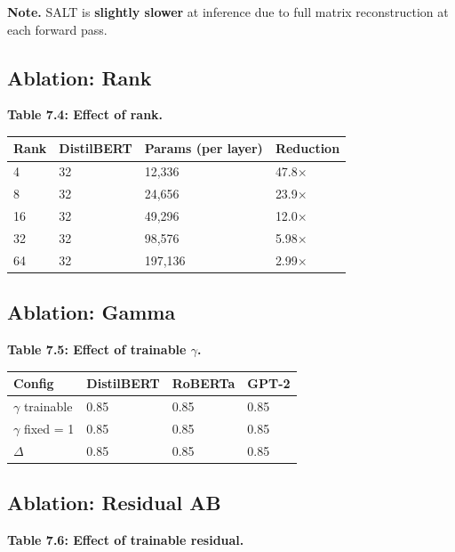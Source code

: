 \textbf{Note.} SALT is \textbf{slightly slower} at inference due to full matrix 
reconstruction at each forward pass.

\subsection{Ablation: Rank}

\textbf{Table 7.4: Effect of rank.}

\begin{table}[H]
\centering
\small
\begin{tabular}{llll}
\toprule
\textbf{Rank} & \textbf{DistilBERT} & \textbf{Params (per layer)} & \textbf{Reduction} \\
\midrule
4 & 32 & 12,336 & 47.8$\times$ \\
8 & 32 & 24,656 & 23.9$\times$ \\
16 & 32 & 49,296 & 12.0$\times$ \\
32 & 32 & 98,576 & 5.98$\times$ \\
64 & 32 & 197,136 & 2.99$\times$ \\
\bottomrule
\end{tabular}
\end{table}

\subsection{Ablation: Gamma}

\textbf{Table 7.5: Effect of trainable $\gamma$.}

\begin{table}[H]
\centering
\small
\begin{tabular}{llll}
\toprule
\textbf{Config} & \textbf{DistilBERT} & \textbf{RoBERTa} & \textbf{GPT-2} \\
\midrule
$\gamma$ trainable & 0.85 & 0.85 & 0.85 \\
$\gamma$ fixed = 1 & 0.85 & 0.85 & 0.85 \\
$\Delta$ & 0.85 & 0.85 & 0.85 \\
\bottomrule
\end{tabular}
\end{table}

\subsection{Ablation: Residual AB}

\textbf{Table 7.6: Effect of trainable residual.}

